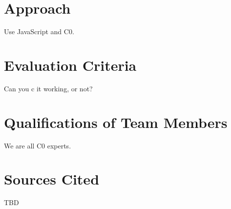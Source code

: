\documentclass[11pt]{article}
\begin{document}
\section{Approach}
Use JavaScript and C0.

\section{Evaluation Criteria}
Can you c it working, or not?

\section{Qualifications of Team Members}
We are all C0 experts.

\section{Sources Cited}
TBD
\end{document}
